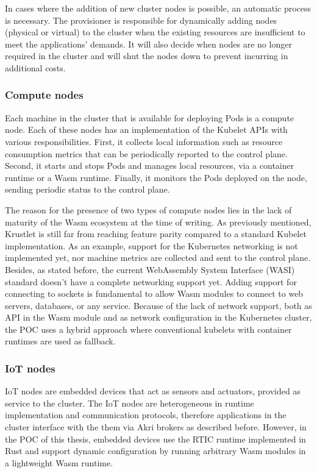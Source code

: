 In cases where the addition of new cluster nodes is possible, an automatic process is necessary. The provisioner is responsible for dynamically adding nodes (physical or virtual) to the cluster when the existing resources are insufficient to meet the applications' demands. It will also decide when nodes are no longer required in the cluster and will shut the nodes down to prevent incurring in additional costs.

\subsubsection{Compute nodes}

Each machine in the cluster that is available for deploying Pods is a compute node. Each of these nodes has an implementation of the Kubelet APIs with various responsibilities. First, it collects local information such as resource consumption metrics that can be periodically reported to the control plane. Second, it starts and stops Pods and manages local resources, via a container runtime or a Wasm runtime. Finally, it monitors the Pods deployed on the node, sending periodic status to the control plane.

The reason for the presence of two types of compute nodes lies in the lack of maturity of the Wasm ecosystem at the time of writing. As previously mentioned, Krustlet is still far from reaching feature parity compared to a standard Kubelet implementation. As an example, support for the Kubernetes networking is not implemented yet, nor machine metrics are collected and sent to the control plane. Besides, as stated before, the current WebAssembly System Interface (WASI) standard doesn't have a complete networking support yet. Adding support for connecting to sockets is fundamental to allow Wasm modules to connect to web servers, databases, or any service. Because of the lack of network support, both as API in the Wasm module and as network configuration in the Kubernetes cluster, the POC uses a hybrid approach where conventional kubelets with container runtimes are used as fallback.

\subsubsection{IoT nodes}

IoT nodes are embedded devices that act as sensors and actuators, provided as service to the cluster. The IoT nodes are heterogeneous in runtime implementation and communication protocols, therefore applications in the cluster interface with the them via Akri brokers as described before. However, in the POC of this thesis, embedded devices use the RTIC runtime implemented in Rust and support dynamic configuration by running arbitrary Wasm modules in a lightweight Wasm runtime.

